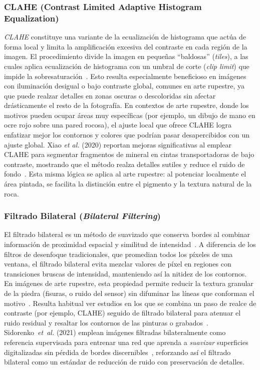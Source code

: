 \subsubsection{CLAHE (Contrast Limited Adaptive Histogram Equalization)}

\textit{CLAHE} constituye una variante de la ecualización de histograma que actúa de forma local y limita la amplificación excesiva del contraste en cada región de la imagen.
El procedimiento divide la imagen en pequeñas “baldosas” (\textit{tiles}), a las cuales aplica ecualización de histograma con un umbral de corte (\textit{clip limit}) que impide la sobresaturación~\cite{xiao2020}.
Esto resulta especialmente beneficioso en imágenes con iluminación desigual o bajo contraste global, comunes en arte rupestre, ya que puede realzar detalles en zonas oscuras o descoloridas sin afectar drásticamente el resto de la fotografía.
En contextos de arte rupestre, donde los motivos pueden ocupar áreas muy específicas (por ejemplo, un dibujo de mano en ocre rojo sobre una pared rocosa), el ajuste local que ofrece CLAHE logra enfatizar mejor los contornos y colores que podrían pasar desapercibidos con un ajuste global.
Xiao \textit{et al.} (2020) reportan mejoras significativas al emplear CLAHE para segmentar fragmentos de mineral en cintas transportadoras de bajo contraste, mostrando que el método realza detalles sutiles y reduce el ruido de fondo~\cite{xiao2020}.
Esta misma lógica se aplica al arte rupestre: al potenciar localmente el área pintada, se facilita la distinción entre el pigmento y la textura natural de la roca.

\subsubsection{Filtrado Bilateral (\textit{Bilateral Filtering})}

El filtrado bilateral es un método de suavizado que conserva bordes al combinar información de proximidad espacial y similitud de intensidad~\cite{paris2008,sidorenko2021}.
A diferencia de los filtros de desenfoque tradicionales, que promedian todos los píxeles de una ventana, el filtrado bilateral evita mezclar valores de píxel en regiones con transiciones bruscas de intensidad, manteniendo así la nitidez de los contornos.
En imágenes de arte rupestre, esta propiedad permite reducir la textura granular de la piedra (fisuras, o ruido del sensor) sin difuminar las líneas que conforman el motivo~\cite{xiao2020}.
Resulta habitual ver estudios en los que se combina un paso de realce de contraste (por ejemplo, CLAHE) seguido de filtrado bilateral para atenuar el ruido residual y resaltar los contornos de las pinturas o grabados~\cite{li2022}.
Sidorenko~\textit{et~al.} (2021) emplean imágenes filtradas bilateralmente como referencia supervisada para entrenar una red que aprenda a \emph{suavizar} superficies digitalizadas sin pérdida de bordes discernibles~\cite{sidorenko2021}, reforzando así el filtrado bilateral como un estándar de reducción de ruido con preservación de detalles.

